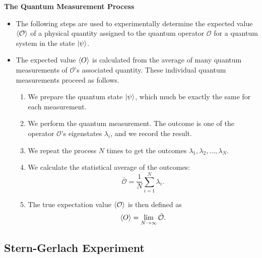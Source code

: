 \documentclass[11pt, a4paper]{article}
\renewcommand{\O}{\mathcal{O}}  %
\begin{document}
\textbf{The Quantum Measurement Process}
\begin{itemize}
    \item The following steps are used to experimentally determine the expected value $ \ev{\O} $ of a physical quantity assigned to the quantum operator $ \O $ for a quantum system in the state $ \ket{\psi} $.

    \item The expected value $ \ev{O} $ is calculated from the average of many quantum measurements of $ \O $'s associated quantity. These individual quantum measurements proceed as follows.
    \begin{enumerate}
        \item We prepare the quantum state $ \ket{\psi} $, which much be exactly the same for each measurement.

        \item We perform the quantum measurement. The outcome is one of the operator $ \O $'s eigenstates $ \lambda_{i} $, and we record the result.

        \item We repeat the process $ N $ times to get the outcomes $ \lambda_{1}, \lambda_{2}, \ldots, \lambda_{N} $.

        \item We calculate the statistical average of the outcomes:
        \begin{equation*}
            \bar{\O} = \frac{1}{N}\sum_{i = 1}^{N} \lambda_{i}.
        \end{equation*}
        
        \item The true expectation value $ \ev{\O} $ is then defined as
        \begin{equation*}
            \ev{O} = \lim_{N \to \infty} \bar{\O}.
        \end{equation*}
        
        
        
        
    \end{enumerate}
\end{itemize}


\subsection{Stern-Gerlach Experiment}
\end{document}
